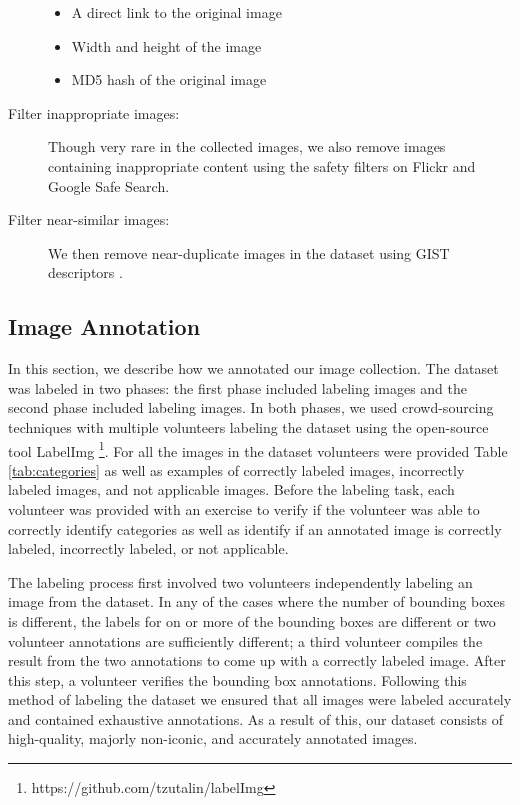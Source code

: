 \documentclass{article}
\begin{document}
\begin{description}
    \begin{itemize}
     \item A direct link to the original image
     \item Width and height of the image
     \item MD5 hash of the original image
    \end{itemize}
   \item[Filter inappropriate images:] Though very rare in the collected images, we also remove images containing inappropriate content using the safety filters on Flickr and Google Safe Search.
   \item[Filter near-similar images:] We then remove near-duplicate images in the dataset using GIST descriptors \cite{douze2009evaluation}.
\end{description}

\subsection{Image Annotation}
\label{Image Annotation}

In this section, we describe how we annotated our image collection. The dataset was labeled in two phases: the first phase included labeling  images and the second phase included labeling  images. In both phases, we used crowd-sourcing techniques with multiple volunteers labeling the dataset using the open-source tool LabelImg \footnote{https://github.com/tzutalin/labelImg}. For all the images in the dataset volunteers were provided Table \ref{tab:categories} as well as examples of correctly labeled images, incorrectly labeled images, and not applicable images. Before the labeling task, each volunteer was provided with an exercise to verify if the volunteer was able to correctly identify categories as well as identify if an annotated image is correctly labeled, incorrectly labeled, or not applicable.

The labeling process first involved two volunteers independently labeling an image from the dataset. In any of the cases where the number of bounding boxes is different, the labels for on or more of the bounding boxes are different or two volunteer annotations are sufficiently different; a third volunteer compiles the result from the two annotations to come up with a correctly labeled image. After this step, a volunteer verifies the bounding box annotations. Following this method of labeling the dataset we ensured that all images were labeled accurately and contained exhaustive annotations. As a result of this, our dataset consists of  high-quality, majorly non-iconic, and accurately annotated images.
\end{document}
